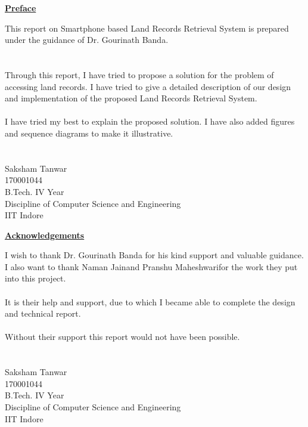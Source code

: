 \documentclass[12pt]{article}
\newcommand{\mainauth}{Saksham Tanwar}
\newcommand{\roll}{170001044}
\newcommand{\conta}{Naman Jain}
\newcommand{\contb}{Pranshu Maheshwari}
\begin{document}

{
    \begin{center}
        \textbf{\underline{\large{Preface}}}
    \end{center}
    This report on Smartphone based Land Records Retrieval System is prepared under the guidance of Dr. Gourinath Banda.\\
    \\
    \\
    Through this report, I have tried to propose a solution for the problem of accessing land records. I have tried to give a detailed description of our design and implementation of the proposed Land Records Retrieval System.\\
    \\
    I have tried my best to explain the proposed solution. I have also added figures and sequence diagrams to make it illustrative.\\
    \\
    \\
    \mainauth\\
    \roll\\
    B.Tech. IV Year\\
    Discipline of Computer Science and Engineering\\
    IIT Indore 


    \thispagestyle{empty}
}

\clearpage


{
    \begin{center}
        \textbf{\underline{\large{Acknowledgements}}}
    \end{center}
    I wish to thank Dr. Gourinath Banda for his kind support and valuable guidance. I also want to thank \conta\space and \contb\space for the work they put into this project.\\
    \\
    It is their help and support, due to which I became able to complete the design and technical report.\\
    \\
    Without their support this report would not have been possible.\\
    \\
    \\
    \mainauth\\
    \roll\\
    B.Tech. IV Year\\
    Discipline of Computer Science and Engineering\\
    IIT Indore 
    \thispagestyle{empty}
}
\end{document}
